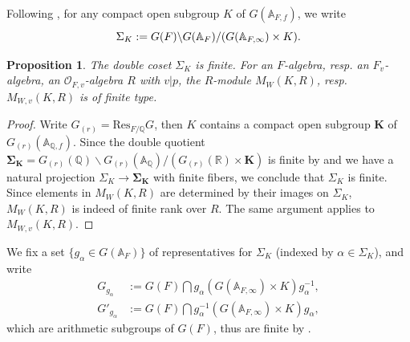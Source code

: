 \documentclass[12pt,oneside,reqno]{amsart}
\theoremstyle{plain}
\newtheorem{proposition}[theorem]{Proposition}
\begin{document}
	
	Following
	\cite[Proposition 4.3]{Gross1999},
	for any compact open subgroup $K$ of
	$G(\mathbb{A}_{F,f})$,
	we write
	\[
	\Sigma_K
	:=
	G(F)\backslash
	G(\mathbb{A}_F)/
	(G(\mathbb{A}_{F,\infty})\times K).\index{S@$\Sigma_K$}
	\]
	\begin{proposition}
		The double coset
		$\Sigma_K$
		is finite.
		For an $F$-algebra,
		resp.
		an $F_v$-algebra,
		an $\mathcal{O}_{F,v}$-algebra $R$
		with
		$v|p$,
		the $R$-module
		$M_W(K,R)$,
		resp.
		$M_{W,v}(K,R)$
		is of finite type.
	\end{proposition}
	\begin{proof}
		Write
		$G_{(r)}=\mathrm{Res}_{F/\mathbb{Q}}G$,
		then $K$ contains a compact open subgroup
		$\mathbf{K}$ of
		$G_{(r)}(\mathbb{A}_{\mathbb{Q},f})$.
		Since the double quotient
		$\mathbf{\Sigma}_\mathbf{K}
		=
		G_{(r)}(\mathbb{Q})
		\backslash
		G_{(r)}(\mathbb{A}_\mathbb{Q})/
		(G_{(r)}(\mathbb{R})\times\mathbf{K})$
		is finite by \cite{Gross1999}
		and we have a natural projection
		$\Sigma_K
		\rightarrow
		\mathbf{\Sigma}_\mathbf{K}$
		with finite fibers,
		we conclude that
		$\Sigma_K$ is finite.
		Since elements in
		$M_W(K,R)$
		are determined by their images on
		$\Sigma_K$,		
		$M_W(K,R)$
		is indeed of finite rank over $R$.
		The same argument applies to
		$M_{W,v}(K,R)$.
	\end{proof}
	
	
	
	We fix a set
	$\{g_\alpha\in G(\mathbb{A}_F)\}$
	of representatives for
	$\Sigma_K$
	(indexed by $\alpha\in\Sigma_K$),
	and write
	\begin{align*}
		G_{g_\alpha}
		&
		:=
		G(F)\bigcap
		g_\alpha(G(\mathbb{A}_{F,\infty})\times K)g_\alpha^{-1},
		\\
		G'_{g_\alpha}
		&
		:=
		G(F)
		\bigcap
		g_\alpha^{-1}
		(G(\mathbb{A}_{F,\infty})\times K)
		g_\alpha,
	\end{align*}
	which are arithmetic subgroups of $G(F)$,
	thus are finite by
	\cite[Proposition 1.4]{Gross1999}.
	
	
	
	
	
	
	
	
	
\end{document}

